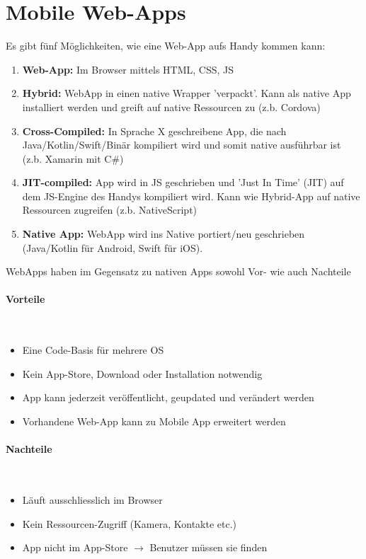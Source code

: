 \documentclass[a4paper, 11pt]{article}
\begin{document}
\section{Mobile Web-Apps}
Es gibt fünf Möglichkeiten, wie eine Web-App aufs Handy kommen kann:

\begin{enumerate}
	\item \textbf{Web-App: } Im Browser mittels HTML, CSS, JS
	\item \textbf{Hybrid:} WebApp in einen native Wrapper 'verpackt'. Kann als native App installiert werden und greift auf native Ressourcen zu (z.b. Cordova)
	\item \textbf{Cross-Compiled:} In Sprache X geschreibene App, die nach Java/Kotlin/Swift/Binär kompiliert wird und somit native ausführbar ist (z.b. Xamarin mit C\#)
	\item \textbf{JIT-compiled:} App wird in JS geschrieben und 'Just In Time' (JIT) auf dem JS-Engine des Handys kompiliert wird. Kann wie Hybrid-App auf native Ressourcen zugreifen (z.b. NativeScript)
	\item \textbf{Native App:} WebApp wird ins Native portiert/neu geschrieben (Java/Kotlin für Android, Swift für iOS).
\end{enumerate}

\noindent WebApps haben im Gegensatz zu nativen Apps sowohl Vor- wie auch Nachteile

\begin{multicols}{2}
	\paragraph{Vorteile}\mbox{}\\
	\begin{itemize}
		\item Eine Code-Basis für mehrere OS
		\item Kein App-Store, Download oder Installation notwendig
		\item App kann jederzeit veröffentlicht, geupdated und verändert werden
		\item Vorhandene Web-App kann zu Mobile App erweitert werden
	\end{itemize}
\columnbreak
	\paragraph{Nachteile}\mbox{}\\
	\begin{itemize}
		\item Läuft ausschliesslich im Browser
		\item Kein Ressourcen-Zugriff (Kamera, Kontakte etc.)
		\item App nicht im App-Store $\rightarrow$ Benutzer müssen sie finden
	\end{itemize}
\end{multicols}
\end{document}
